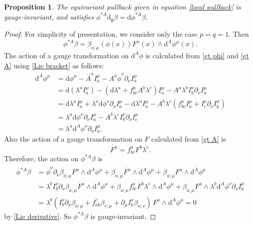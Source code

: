 \documentclass[pdftex]{sigma}
\newcommand{\g}{{\mathfrak{g}}}
\newcommand{\1}{{\mathbb{1}}}
\def \d{\mathrm{d}}
\numberwithin{equation}{section}
\newtheorem{Proposition}[Theorem]{Proposition}
 { \theoremstyle{definition}
\newtheorem{Definition}[Theorem]{Definition}
\newtheorem{Note}[Theorem]{Note}
\newtheorem{Example}[Theorem]{Example}
\newtheorem{Remark}[Theorem]{Remark} }
\begin{document}
\begin{Proposition}\label{Prop:pullback-properties}
The equivariant pullback given in equation \eqref{local pullback} is gauge-invariant, and satisfies $\phi^{\ast A}\d_\g\beta = \d\phi^{\ast A}\beta$.
\end{Proposition}
\begin{proof}
For simplicity of presentation, we consider only the case $p=q=1$. Then
\begin{equation*}
\phi^{\ast A}\beta = \beta_{a;\mu}(\phi(x))F^a(x)\wedge \d^A\phi^\mu(x) .
\end{equation*}
The action of a gauge transformation on $\d^A\phi$ is calculated from \eqref{gt phi} and \eqref{gt A} using \eqref{Lie bracket} as follows:
\begin{align*}
\dot{\d^A\phi^\mu}&=\d \dot{\phi^\mu}-\dot{A}^aI_a^\mu-A^a\dot{\phi}^\nu\partial_\nu I_a^\mu \\
&=\d(\lambda^a I_a^\mu)-(\d\lambda^a+f^a_{bc}A^b\lambda^c)I_a^\mu - A^a\lambda^bI_b^\nu\partial_\nu I_a^\mu \\
&=\d\lambda^a I_a^\mu + \lambda^a\d\phi^\nu \partial_\nu I_a^\mu-\d\lambda^aI_a^\mu-A^b\lambda^c(f^a_{bc}I_a^\mu + I_c^\nu\partial_\nu I_b^\mu) \\
&=\lambda^a\d\phi^\nu \partial_\nu I_a^\mu-A^b\lambda^cI_b^\nu\partial_\nu I_c^\mu \\
&=\lambda^a \d^A\phi^\nu\partial_\nu I_a^\mu.
\end{align*}
Also the action of a gauge transformation on $F$ calculated from \eqref{gt A} is
\begin{equation*}
\dot{F^a}=f^a_{bc}F^b\lambda^c.
\end{equation*}
Therefore, the action on $\phi^{\ast A}\beta$ is{\samepage
\begin{align*}
\dot{\phi^{\ast A}\beta}&=\dot\phi^\nu\partial_\nu\beta_{a;\mu}F^a\wedge \d^A\phi^\mu + \beta_{a;\mu}\dot{F^a}\wedge \d^A\phi^\mu + \beta_{a;\mu}F^a\wedge \dot{\d^A\phi^\mu} \\
&=\lambda^bI_b^\nu\partial_\nu\beta_{a;\mu}F^a\wedge \d^A\phi^\mu + \beta_{a;\mu}f^a_{bc}F^b\lambda^c\wedge \d^A\phi^\mu + \beta_{a;\mu}F^a\wedge \lambda^b \d^A\phi^\nu\partial_\nu I_b^\mu \\
&=\lambda^b(I_b^\nu\partial_\nu\beta_{a;\mu} + f^c_{ab}\beta_{c;\mu} + \partial_\mu I_b^\nu\beta_{a;\nu})\,F^a\wedge \d^A\phi^\mu
=0
\end{align*}
by \eqref{Lie derivative}. So $\phi^{\ast A}\beta$ is gauge-invariant.}


\end{proof}
\end{document}
